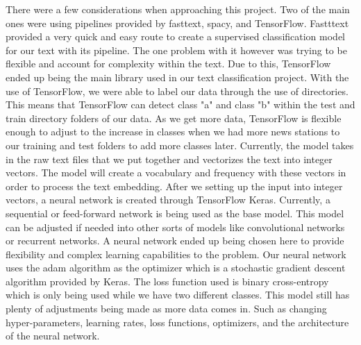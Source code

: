 There were a few considerations when approaching this project. Two of the main ones were using pipelines provided by fasttext, spacy, and TensorFlow. Fastttext provided a very quick and easy route to create a supervised classification model for our text with its pipeline. The one problem with it however was trying to be flexible and account for complexity within the text. Due to this, TensorFlow ended up being the main library used in our text classification project. With the use of TensorFlow, we were able to label our data through the use of directories. This means that TensorFlow can detect class "a" and class "b" within the test and train directory folders of our data. As we get more data, TensorFlow is flexible enough to adjust to the increase in classes when we had more news stations to our training and test folders to add more classes later. Currently, the model takes in the raw text files that we put together and vectorizes the text into integer vectors. The model will create a vocabulary and frequency with these vectors in order to process the text embedding. After we setting up the input into integer vectors, a neural network is created through TensorFlow Keras. Currently, a sequential or feed-forward network is being used as the base model. This model can be adjusted if needed into other sorts of models like convolutional networks or recurrent networks. A neural network ended up being chosen here to provide flexibility and complex learning capabilities to the problem. Our neural network uses the adam algorithm as the optimizer which is a stochastic gradient descent algorithm provided by Keras. The loss function used is binary cross-entropy which is only being used while we have two different classes. This model still has plenty of adjustments being made as more data comes in. Such as changing hyper-parameters, learning rates, loss functions, optimizers, and the architecture of the neural network.